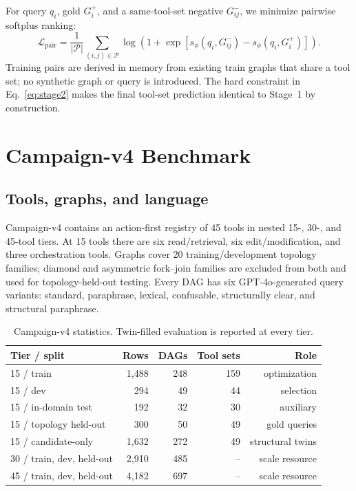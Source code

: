 \documentclass{article}
\begin{document}
For query $q_i$, gold $G_i^+$, and a same-tool-set negative $G_{ij}^-$, we minimize pairwise softplus ranking:
\begin{equation}
    \mathcal L_{\mathrm{pair}}=
    \frac{1}{|\mathcal P|}\sum_{(i,j)\in\mathcal P}
    \log\left(1+\exp\left[s_\phi(q_i,G_{ij}^-)-s_\phi(q_i,G_i^+)\right]\right).
    \label{eq:pairloss}
\end{equation}
Training pairs are derived in memory from existing train graphs that share a tool set; no synthetic graph or query is introduced.
The hard constraint in Eq.~\ref{eq:stage2} makes the final tool-set prediction identical to Stage~1 by construction.

\section{Campaign-v4 Benchmark}

\subsection{Tools, graphs, and language}

Campaign-v4 contains an action-first registry of 45 tools in nested 15-, 30-, and 45-tool tiers.
At 15 tools there are six read/retrieval, six edit/modification, and three orchestration tools.
Graphs cover 20 training/development topology families; diamond and asymmetric fork--join families are excluded from both and used for topology-held-out testing.
Every DAG has six GPT-4o-generated query variants: standard, paraphrase, lexical, confusable, structurally clear, and structural paraphrase.

\begin{table}[t]
\caption{Campaign-v4 statistics.  Twin-filled evaluation is reported at every tier.}
\label{tab:data}
\centering
\small
\begin{tabular}{lrrrr}
\toprule
Tier / split & Rows & DAGs & Tool sets & Role \\
\midrule
15 / train & 1,488 & 248 & 159 & optimization \\
15 / dev & 294 & 49 & 44 & selection \\
15 / in-domain test & 192 & 32 & 30 & auxiliary \\
15 / topology held-out & 300 & 50 & 49 & gold queries \\
15 / candidate-only & 1,632 & 272 & 49 & structural twins \\
\midrule
30 / train, dev, held-out & 2,910 & 485 & -- & scale resource \\
45 / train, dev, held-out & 4,182 & 697 & -- & scale resource \\
\bottomrule
\end{tabular}
\end{table}
\end{document}
